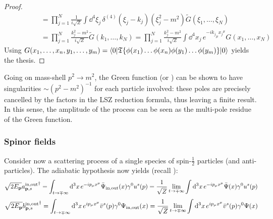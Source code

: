 \begin{proofbox}
\begin{proof}
\begin{equation*}
\begin{split}
        & \qquad \qquad = \prod_{j = 1}^N \frac{1}{i \sqrt{Z}} \int \dd^4\xi_j\, \delta^{(4)}(\xi_j - k_j) (\xi_j^2 - m^2) \tilde{G}(\xi_1, \dots, \xi_N) \\
        & \qquad \qquad = \prod_{j = 1}^N \frac{k_j^2 - m^2}{i \sqrt{Z}} \tilde{G}(k_1, \dots, k_N) = \prod_{j = 1}^N \frac{k_j^2 - m^2}{i\sqrt{Z}} \int \dd^4x_j\, e^{-i {k_j}_\mu {x_j}^\mu} G(x_1, \dots, x_N)
      \end{split}
    \end{equation*}
    Using $ G(x_1, \dots, x_n , y_1, \dots, y_m) =  \braket{0 | \mathfrak{T}\{\phi(x_1) \dots \phi(x_n) \phi(y_1) \dots \phi(y_m)\} | 0} $ yields the thesis.
  \end{proof}
\end{proofbox}

Going on mass-shell $ p^2 \rightarrow m^2 $, the Green function (or ) can be shown to have singularities $ \sim (p^2 - m^2)^{-1} $ for each particle involved: these poles are precisely cancelled by the factors in the LSZ reduction formula, thus leaving a finite result. In this sense, the amplitude of the process can be seen as the multi-pole residue of the Green function.

\subsubsection{Spinor fields}

Consider now a scattering process of a single species of spin-$ \frac{1}{2} $ particles (and anti-particles). The adiabatic hypothesis now yields (recall ):
\begin{equation}
  \sqrt{2E_{\mathbf{p}}} {a_{\mathbf{p},s}^\text{in,out}}^\dagger = \int_{t \rightarrow \mp \infty} \mathrm{d}^3x\, e^{-i p_\mu x^\mu} \bar{\Psi}_\text{in,out}(x) \gamma^0 u^s(p) = \frac{1}{\sqrt{Z}} \lim_{t \rightarrow \mp \infty} \int \mathrm{d}^3x\, e^{-i p_\mu x^\mu} \bar{\Psi}(x) \gamma^0 u^s(p)
\end{equation}
\begin{equation}
  \sqrt{2E_{\mathbf{p}}} {b_{\mathbf{p},s}^\text{in,out}}^\dagger = \int_{t \rightarrow \mp \infty} \mathrm{d}^3x\, e^{i p_\mu x^\mu} \bar{v}^s(p) \gamma^0 \Psi_\text{in,out}(x) = \frac{1}{\sqrt{Z}} \lim_{t \rightarrow \mp \infty} \int \mathrm{d}^3x\, e^{i p_\mu x^\mu} \bar{v}^s(p) \gamma^0 \Psi(x)
\end{equation}

